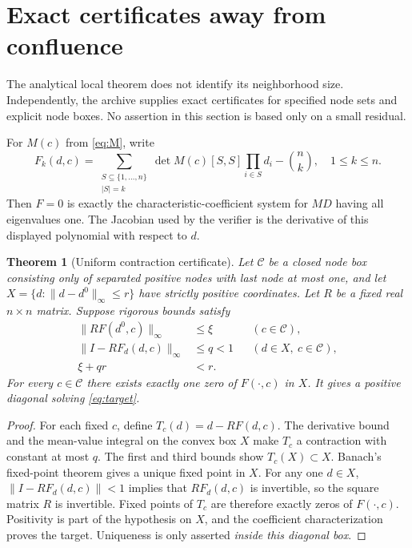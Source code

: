 \documentclass[11pt]{article}
\newtheorem{theorem}{Theorem}[section]
\theoremstyle{remark}\newtheorem{remark}[theorem]{Remark}
\begin{document}
\section{Exact certificates away from confluence}\label{sec:cert}
The analytical local theorem does not identify its neighborhood size.
Independently, the archive supplies exact certificates for specified node
sets and explicit node boxes. No assertion in this section is based only on
a small residual.

For $M(c)$ from \eqref{eq:M}, write
\begin{equation}\label{eq:F}
 F_k(d,c)=\sum_{\substack{S\subseteq\{1,\ldots,n\}\\|S|=k}}
              \det M(c)[S,S]\prod_{i\in S}d_i-\binom nk,
 \quad 1\le k\le n.
\end{equation}
Then $F=0$ is exactly the characteristic-coefficient system for $MD$ having
all eigenvalues one. The Jacobian used by the verifier is the derivative of
this displayed polynomial with respect to $d$.

\begin{theorem}[Uniform contraction certificate]\label{thm:certificate}
Let $\mathcal C$ be a closed node box consisting only of separated positive
nodes with last node at most one, and let
$X=\{d:\|d-d^0\|_\infty\le r\}$ have strictly positive coordinates.
Let $R$ be a fixed real $n\times n$ matrix. Suppose rigorous bounds satisfy
\begin{align}\label{eq:bounds}
 \|RF(d^0,c)\|_\infty&\le\xi &&(c\in\mathcal C),\\
 \|I-RF_d(d,c)\|_\infty&\le q<1 &&(d\in X,\ c\in\mathcal C),\nonumber\\
 \xi+qr&<r.&&\nonumber
\end{align}
For every $c\in\mathcal C$ there exists exactly one zero of $F(\cdot,c)$ in
$X$. It gives a positive diagonal solving \eqref{eq:target}.
\end{theorem}
\begin{proof}
For each fixed $c$, define $T_c(d)=d-RF(d,c)$. The derivative bound and the
mean-value integral on the convex box $X$ make $T_c$ a contraction with
constant at most $q$. The first and third bounds show $T_c(X)\subset X$.
Banach's fixed-point theorem gives a unique fixed point in $X$.
For any one $d\in X$, $\|I-RF_d(d,c)\|<1$ implies that $RF_d(d,c)$ is
invertible, so the square matrix $R$ is invertible. Fixed points of $T_c$
are therefore exactly zeros of $F(\cdot,c)$. Positivity is part of the
hypothesis on $X$, and the coefficient characterization proves the target.
Uniqueness is only asserted \emph{inside this diagonal box}.
\end{proof}
\end{document}
